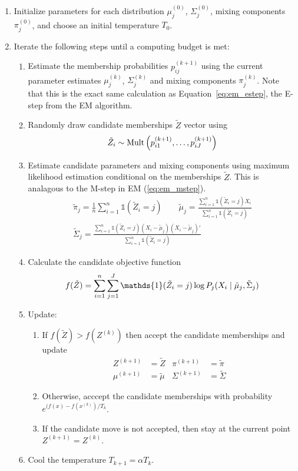 \documentclass{article}
\newcommand*{\I}{\mathds{1}}
\newcommand*{\cond}{\;\ifnum\currentgrouptype=16 \middle\fi|\;}
\newcommand*{\mt}[1]{\text{\normalfont #1}}
\newcommand*{\dist}{\sim}
\theoremstyle{definition}
\theoremstyle{algodesc}
\begin{document}
\begin{enumerate}
\item Initialize parameters for each distribution $\mu_j^{(0)}$, $\Sigma_j^{(0)}$, mixing components $\pi_j^{(0)}$, and choose an initial temperature $T_0$.
\item Iterate the following steps until a computing budget is met:
  \begin{enumerate}
  \item Estimate the membership probabilities $p_{ij}^{(k+1)}$ using the current parameter estimates $\mu_j^{(k)}$, $\Sigma_j^{(k)}$ and mixing components $\pi_j^{(k)}$. Note that this is the exact same calculation as Equation~\ref{eq:em_estep}, the E-step from the EM algorithm.
  \item Randomly draw candidate memberships $\tilde{Z}$ vector using
    \begin{equation*}
    \tilde{Z}_i \dist \mt{Mult}\left(p_{i1}^{(k+1)}, \dots, p_{iJ}^{(k+1)}\right)
    \end{equation*}
  \item Estimate candidate parameters and mixing components using maximum likelihood estimation conditional on the memberships $\tilde{Z}$. This is analagous to the M-step in EM (\ref{eq:em_mstep}).
    \begin{equation} \label{eq:sa_mstep}
    \begin{gathered}
    \tilde{\pi}_j = \frac{1}{n} \sum_{i=1}^n \I(\tilde{Z}_i = j) \qquad
    \tilde{\mu}_j = \frac{\sum_{i=1}^n \I(\tilde{Z}_i = j) X_i}{\sum_{i=1}^n \I(\tilde{Z}_i = j)} \\
    \tilde{\Sigma}_j = \frac{\sum_{i=1}^n \I(\tilde{Z}_i = j) (X_i - \tilde{\mu}_j) (X_i - \tilde{\mu}_j)'}{\sum_{i=1}^n \I(\tilde{Z}_i = j)}
    \end{gathered}
    \end{equation}
  \item Calculate the candidate objective function
    \begin{equation*}
    f(\tilde{Z}) = \sum_{i=1}^n \sum_{j=1}^J \I(\tilde{Z}_i = j) \log P_j(X_i \cond \tilde{\mu}_j, \tilde{\Sigma}_j)
    \end{equation*}
  \item Update:
    \begin{enumerate}
    \item If $f(\tilde{Z}) > f(Z^{(k)})$ then accept the candidate memberships and update
      \begin{align*}
      Z^{(k+1)} &= \tilde{Z} & \pi^{(k+1)} &= \tilde{\pi} \\
      \mu^{(k+1)} &= \tilde{\mu} & \Sigma^{(k+1)} &= \tilde{\Sigma}
      \end{align*}
    \item Otherwise, acccept the candidate memberships with probability $e^{(f(x) - f(x^{(k)})/T_k}$.
    \item If the candidate move is not accepted, then stay at the current point $Z^{(k+1)} = Z^{(k)}$.
    \end{enumerate}
  \item Cool the temperature $T_{k+1} = \alpha T_{k}$.
  \end{enumerate}
\end{enumerate}
\end{document}
